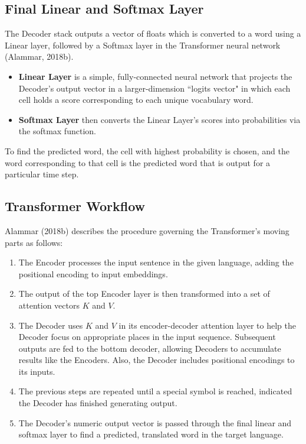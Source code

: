 \subsection{Final Linear and Softmax Layer} \label{sec:TransformerFinalLayer}


The Decoder stack outputs a vector of floats which is converted to a word using a Linear layer, followed by a Softmax layer in the Transformer neural network (Alammar, 2018b). 
\begin{itemize}
    \item \textbf{Linear Layer} is a simple, fully-connected neural network that projects the Decoder's output vector in a larger-dimension ``logits vector" in which each cell holds a score corresponding to each unique vocabulary word. 
    
    \item \textbf{Softmax Layer} then converts the Linear Layer's scores into probabilities via the softmax function. 
\end{itemize}

To find the predicted word, the cell with highest probability is chosen, and the word corresponding to that cell is the predicted word that is output for a particular time step.




\subsection{Transformer Workflow} \label{sec:TransformerWorkflow}

Alammar (2018b) describes the procedure governing the Transformer's moving parts as follows: 

\begin{enumerate}
    \item The Encoder processes the input sentence in the given language, adding the positional encoding to input embeddings.
    
    \item The output of the top Encoder layer is then transformed into a set of attention vectors $K$ and $V$.
    
    \item The Decoder uses $K$ and $V$ in its encoder-decoder attention layer to help the Decoder focus on appropriate places in the input sequence. Subsequent outputs are fed to the bottom decoder, allowing Decoders to accumulate results like the Encoders. Also, the Decoder includes positional encodings to its inputs. 
    
    \item The previous steps are repeated until a special symbol is reached, indicated the Decoder has finished generating output.
    
    \item The Decoder's numeric output vector is passed through the final linear and softmax layer to find a predicted, translated word in the target language. 
    
\end{enumerate}

